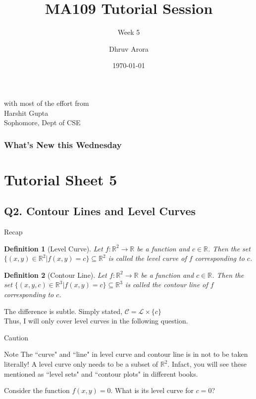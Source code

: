 \documentclass[handout,aspectratio=169]{beamer}
\title{MA109 Tutorial Session}
\subtitle{Week 5}
\author{Dhruv Arora}
\institute{Sophomore, Dept of CSE}
\date{\today}
\newtheorem{df}{Definition}
\newcommand{\bR}{\mathbb{R}}
\begin{document}
\begin{frame}
	\titlepage
	\begin{center}
	{\tiny with most of the effort from}\\
	{\small Harshit Gupta}\\
	{\tiny Sophomore, Dept of CSE}
	\end{center}
\end{frame}

\begin{frame}[plain]
\frametitle{What's New this Wednesday}
\tableofcontents
\end{frame}

\section{Tutorial Sheet 5}

\subsection{Q2. Contour Lines and Level Curves
}

\begin{frame}{Recap}
	\uncover<2-> {
	\begin{df}[Level Curve]
		Let $f:\bR^2 \to \bR$ be a function and $c\in\bR$. Then the set $\{(x,y)\in\bR^2 | f(x,y)=c\}\subseteq \bR^2$ is called the level curve of $f$ corresponding to $c$.
	\end{df}
	}
	 {
	\begin{df}[Contour Line]
		Let $f:\bR^2 \to \bR$ be a function and $c\in\bR$. Then the set $\{(x,y,c)\in\bR^3 | f(x,y)=c\}\subseteq \bR^3$ is called the contour line of $f$ corresponding to $c$.
	\end{df}
	}
	 {
	The difference is subtle. Simply stated, $\mathcal{C} = \mathcal{L}\times\{c\}$\\ 
	}
	\uncover<5-> {
	Thus, I will only cover level curves in the following question.
	}
\end{frame}

\begin{frame}{Caution}
	\begin{block}{Note}
	\uncover<2-> {
	The ``curve" and ``line" in level curve and contour line is in not to be taken literally!
	}
	\uncover<3-> {
	A level curve only needs to be a subset of $\bR^2$. Infact, you will see these mentioned as ``level sets" and ``contour plots" in different books.
	}
	\end{block}
	 {
	\vspace*{5mm}
	Consider the function $f(x,y)=0$. What is its level curve for $c=0$?
	}
\end{frame}
\end{document}
